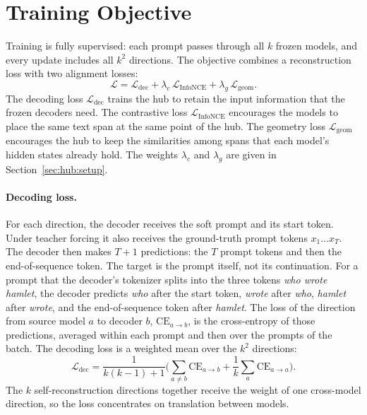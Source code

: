 \section{Training Objective}\label{sec:hub:training}

Training is fully supervised: each prompt passes through all $k$ frozen models, and every update includes all $k^2$ directions.
The objective combines a reconstruction loss with two alignment losses:
\begin{equation}
\mathcal{L} = \mathcal{L}_{\text{dec}} + \lambda_{c}\,\mathcal{L}_{\text{InfoNCE}} + \lambda_{g}\,\mathcal{L}_{\text{geom}} .
\label{eq:hub:loss}
\end{equation}
The decoding loss $\mathcal{L}_{\text{dec}}$ trains the hub to retain the input information that the frozen decoders need.
The contrastive loss $\mathcal{L}_{\text{InfoNCE}}$ encourages the models to place the same text span at the same point of the hub.
The geometry loss $\mathcal{L}_{\text{geom}}$ encourages the hub to keep the similarities among spans that each model's hidden states already hold.
The weights $\lambda_{c}$ and $\lambda_{g}$ are given in Section~\ref{sec:hub:setup}.

\paragraph{Decoding loss.} For each direction, the decoder receives the soft prompt and its start token.
Under teacher forcing it also receives the ground-truth prompt tokens $x_1 \ldots x_T$.
The decoder then makes $T+1$ predictions: the $T$ prompt tokens and then the end-of-sequence token.
The target is the prompt itself, not its continuation.
For a prompt that the decoder's tokenizer splits into the three tokens \emph{who \textbar{} wrote \textbar{} hamlet}, the decoder predicts \emph{who} after the start token, \emph{wrote} after \emph{who}, \emph{hamlet} after \emph{wrote}, and the end-of-sequence token after \emph{hamlet}.
The loss of the direction from source model $a$ to decoder $b$, $\text{CE}_{a\to b}$, is the cross-entropy of those predictions, averaged within each prompt and then over the prompts of the batch.
The decoding loss is a weighted mean over the $k^2$ directions:
\begin{equation}
\mathcal{L}_{\text{dec}} = \frac{1}{k(k-1)+1}\Big(\sum_{a \neq b} \text{CE}_{a\to b} + \frac{1}{k}\sum_{a} \text{CE}_{a\to a}\Big).
\label{eq:hub:dec}
\end{equation}
The $k$ self-reconstruction directions together receive the weight of one cross-model direction, so the loss concentrates on translation between models.

